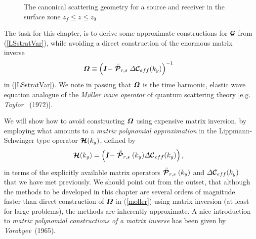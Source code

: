 \begin{figure}
\HideDisplacementBoxes
\centerline{}
\caption{The canonical scattering geometry for a source and receiver in 
the surface zone $z_f \le z \le z_0$}
\protect\label{scatGeom}
\end{figure}




The task for this chapter, is to derive some approximate constructions 
for ${\mbox{\boldmath$\cal G$\unboldmath}}$ from  (\ref{LSstratVar}), while avoiding a direct 
construction of the  enormous matrix inverse 
\begin{equation} \label{moller}
{\mbox{\boldmath$\mit \Omega$\unboldmath}}\equiv
\left({\mbox{\boldmath$\mit I$\unboldmath}} -  
\stackrel{\scriptscriptstyle _{\,\,\circ}}{ \mbox{\boldmath$\cal P$\unboldmath}}_{r,s}
{\mit \Delta}{\mbox{\boldmath$\cal C$\unboldmath}}{}_{eff}(k_y)\right)^{-1}
\end{equation}
in (\ref{LSstratVar}). We note in passing that 
${\mbox{\boldmath$\mit \Omega$\unboldmath}}$ is the time harmonic, elastic wave equation analogue 
of the {\em 
M{\o}ller wave operator\/} of quantum scattering theory 
[e.g. {\em Taylor \/}~(1972)].

We will show how to avoid constructing ${\mbox{\boldmath$\mit \Omega$\unboldmath}}$ using expensive 
matrix inversion,  by employing what amounts to a {\em matrix polynomial 
approximation\/} in
the Lippmann-Schwinger type operator ${\mbox{\boldmath$\cal H$\unboldmath}}(k_y)$, 
defined by
\begin{equation} \label{Hdef}
	 {\mbox{\boldmath$\cal H$\unboldmath}}(k_y)=\left({\mbox{\boldmath$\mit I$\unboldmath}} -  
\stackrel{\scriptscriptstyle _{\,\,\circ}}{ \mbox{\boldmath$\cal P$\unboldmath}}_{r,s}(k_y)
{\mit \Delta}{\mbox{\boldmath$\cal C$\unboldmath}}{}_{eff}(k_y)\right),
\end{equation}
in terms of the explicitly available matrix operators $\stackrel{\scriptscriptstyle _{\,\,\circ}}{ \mbox{\boldmath$\cal P$\unboldmath}}_{r,s}(k_y)$ and ${\mit \Delta}{\mbox{\boldmath$\cal C$\unboldmath}}{}_{eff}(k_y)$ that we have met 
previously. We should point out from the outset, that although the methods 
to be 
developed in this chapter are several orders of magnitude faster than 
direct construction of ${\mbox{\boldmath$\mit \Omega$\unboldmath}}$ in (\ref{moller}) using matrix 
inversion
(at least for large problems), the methods are inherently approximate.
A nice introduction to {\em matrix polynomial constructions of a matrix 
inverse\/} has been given by {\em Vorobyev\/}~(1965). 
 

